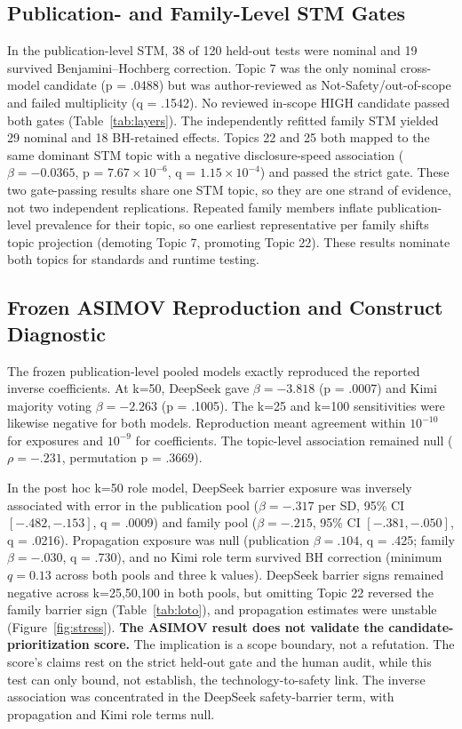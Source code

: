 \documentclass[letterpaper,9pt,conference]{ieeeconf}
\begin{document}
\subsection{Publication- and Family-Level STM Gates}

In the publication-level STM, 38 of 120 held-out tests were nominal and 19 survived Benjamini--Hochberg correction. Topic 7 was the only nominal cross-model candidate (p = .0488) but was author-reviewed as Not-Safety/out-of-scope and failed multiplicity (q = .1542). No reviewed in-scope HIGH candidate passed both gates (Table~\ref{tab:layers}). The independently refitted family STM yielded 29 nominal and 18 BH-retained effects. Topics 22 and 25 both mapped to the same dominant STM topic with a negative disclosure-speed association ($\beta=-0.0365$, p = $7.67\times10^{-6}$, q = $1.15\times10^{-4}$) and passed the strict gate. These two gate-passing results share one STM topic, so they are one strand of evidence, not two independent replications. Repeated family members inflate publication-level prevalence for their topic, so one earliest representative per family shifts topic projection (demoting Topic 7, promoting Topic 22). These results nominate both topics for standards and runtime testing.

\subsection{Frozen ASIMOV Reproduction and Construct Diagnostic}

The frozen publication-level pooled models exactly reproduced the reported inverse coefficients. At k=50, DeepSeek gave $\beta=-3.818$ (p = .0007) and Kimi majority voting $\beta=-2.263$ (p = .1005). The k=25 and k=100 sensitivities were likewise negative for both models. Reproduction meant agreement within $10^{-10}$ for exposures and $10^{-9}$ for coefficients. The topic-level association remained null ($\rho = -.231$, permutation p = .3669).

In the post hoc k=50 role model, DeepSeek barrier exposure was inversely associated with error in the publication pool ($\beta=-.317$ per SD, 95\% CI $[-.482,-.153]$, q = .0009) and family pool ($\beta=-.215$, 95\% CI $[-.381,-.050]$, q = .0216). Propagation exposure was null (publication $\beta=.104$, q = .425; family $\beta=-.030$, q = .730), and no Kimi role term survived BH correction (minimum $q = 0.13$ across both pools and three k values). DeepSeek barrier signs remained negative across k=25,50,100 in both pools, but omitting Topic 22 reversed the family barrier sign (Table~\ref{tab:loto}), and propagation estimates were unstable (Figure~\ref{fig:stress}). \textbf{The ASIMOV result does not validate the candidate-prioritization score.} The implication is a scope boundary, not a refutation. The score's claims rest on the strict held-out gate and the human audit, while this test can only bound, not establish, the technology-to-safety link. The inverse association was concentrated in the DeepSeek safety-barrier term, with propagation and Kimi role terms null.
\end{document}
